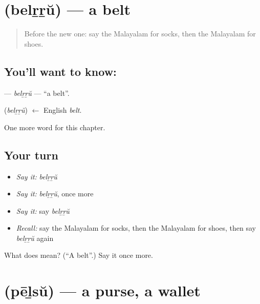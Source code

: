 \section[\texorpdfstring{\ml{ബെൽറ്റ്} (belṟṟŭ)}{ബെൽറ്റ് (belṟṟŭ)}]{ (belṟṟŭ) — a belt}

\label{lesson:ML-C286-belrru}



\begin{quote}
Before the new one: say the Malayalam for socks, then the Malayalam for shoes.
\end{quote}

\subsection*{You'll want to know: }
\textbf{} — \emph{belṟṟŭ} — \textquotedblleft{}a belt\textquotedblright{}.

\begin{cousinweb}
\textbf{} (\emph{belṟṟŭ}) $\leftarrow$ English \emph{belt}.
\end{cousinweb}

\begin{grammarlens}[title={What you've built}]
One more word for this chapter.
\end{grammarlens}

\subsection*{Your turn}
\begin{itemize}
\raggedright
  \item \emph{Say it:} \emph{belṟṟŭ}
  \item \emph{Say it:} \emph{belṟṟŭ}, once more
  \item \emph{Say it:} say \emph{belṟṟŭ}
  \item \emph{Recall:} say the Malayalam for socks, then the Malayalam for shoes, then say \emph{belṟṟŭ} again
\end{itemize}

\begin{tcolorbox}[breakable,colback=teal!4,colframe=teal!35!black,title={Before you move on}]
What does  mean? (\textquotedblleft{}A belt\textquotedblright{}.) Say it once more.
\end{tcolorbox}
\section[\texorpdfstring{\ml{പേഴ്സ്} (pēḻsŭ)}{പേഴ്സ് (pēḻsŭ)}]{ (pēḻsŭ) — a purse, a wallet}

